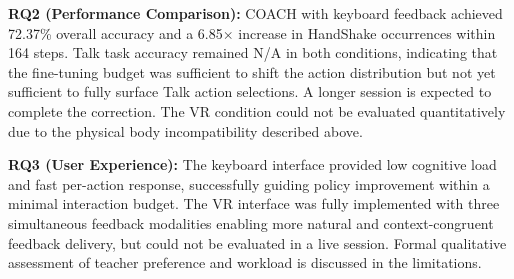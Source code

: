 \documentclass[../report.tex]{subfiles}
\begin{document}
    \textbf{RQ2 (Performance Comparison):} COACH with keyboard feedback achieved 72.37\% overall accuracy and a 6.85$\times$ increase in HandShake occurrences within 164 steps. Talk task accuracy remained N/A in both conditions, indicating that the fine-tuning budget was sufficient to shift the action distribution but not yet sufficient to fully surface Talk action selections. A longer session is expected to complete the correction. The VR condition could not be evaluated quantitatively due to the physical body incompatibility described above.

    \textbf{RQ3 (User Experience):} The keyboard interface provided low cognitive load and fast per-action response, successfully guiding policy improvement within a minimal interaction budget. The VR interface was fully implemented with three simultaneous feedback modalities enabling more natural and context-congruent feedback delivery, but could not be evaluated in a live session. Formal qualitative assessment of teacher preference and workload is discussed in the limitations.
\end{document}
